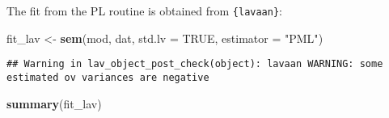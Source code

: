 \documentclass[
]{article}
\newenvironment{Shaded}{\begin{snugshade}}{\end{snugshade}}
\newcommand{\AttributeTok}[1]{\textcolor[rgb]{0.13,0.29,0.53}{#1}}
\newcommand{\ConstantTok}[1]{\textcolor[rgb]{0.56,0.35,0.01}{#1}}
\newcommand{\FunctionTok}[1]{\textcolor[rgb]{0.13,0.29,0.53}{\textbf{#1}}}
\newcommand{\NormalTok}[1]{#1}
\newcommand{\OtherTok}[1]{\textcolor[rgb]{0.56,0.35,0.01}{#1}}
\newcommand{\StringTok}[1]{\textcolor[rgb]{0.31,0.60,0.02}{#1}}
\begin{document}
The fit from the PL routine is obtained from \texttt{\{lavaan\}}:

\begin{Shaded}
\begin{Highlighting}[]
\NormalTok{fit\_lav }\OtherTok{\textless{}{-}} \FunctionTok{sem}\NormalTok{(mod, dat, }\AttributeTok{std.lv =} \ConstantTok{TRUE}\NormalTok{, }\AttributeTok{estimator =} \StringTok{"PML"}\NormalTok{)}
\end{Highlighting}
\end{Shaded}

\begin{verbatim}
## Warning in lav_object_post_check(object): lavaan WARNING: some estimated ov variances are negative
\end{verbatim}

\begin{Shaded}
\begin{Highlighting}[]
\FunctionTok{summary}\NormalTok{(fit\_lav)}
\end{Highlighting}
\end{Shaded}
\end{document}
